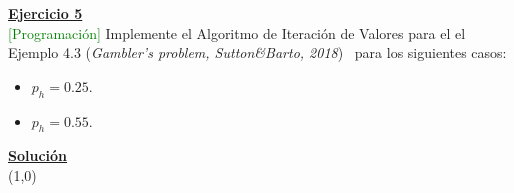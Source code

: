 \indent\underline{\textbf{Ejercicio 5}}\\
\textcolor{green}{[Programación]} Implemente el Algoritmo de Iteración de Valores para el el Ejemplo 4.3 (\textit{Gambler’s problem, Sutton\&Barto, 2018})~\cite{Sutton2018} para los siguientes casos:

\begin{itemize}
    \item $p_h = 0.25$.
    \item $p_h = 0.55$.
\end{itemize}

\indent\underline{\textbf{Solución}}\\


\line(1,0){\textwidth}
